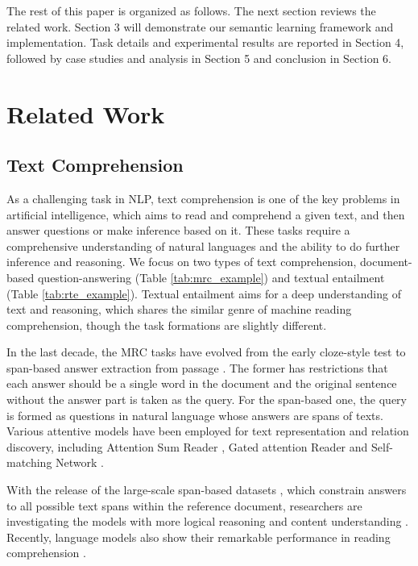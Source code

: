 \documentclass[11pt]{article}
\begin{document}
The rest of this paper is organized as follows. The next section reviews the related work. Section 3 will demonstrate our semantic learning framework and implementation. Task details and experimental results are reported in Section 4, followed by case studies and analysis in Section 5 and conclusion in Section 6.

\section{Related Work}

\subsection{Text Comprehension}
As a challenging task in NLP, text comprehension is one of the key problems in artificial intelligence, which aims to read and comprehend a given text, and then answer questions or make inference based on it. These tasks require a comprehensive understanding of natural languages and the ability to do further inference and reasoning. We focus on two types of text comprehension, document-based question-answering (Table \ref{tab:mrc_example}) and textual entailment (Table \ref{tab:rte_example}). Textual entailment aims for a deep understanding of text and reasoning, which shares the similar genre of machine reading comprehension, though the task formations are slightly different. 

In the last decade, the MRC tasks have evolved from the early cloze-style test \citep{hill2015goldilocks,hermann2015teaching,zhang2018char,zhang2018SubMRC} to span-based answer extraction from passage \citep{Rajpurkar2016SQuAD,Rajpurkar2018Know}. The former has restrictions that each answer should be a single word  in the document and the original sentence without the answer part is taken as the query. For the span-based one, the query is formed as questions in natural language whose answers are spans of texts. Various attentive models have been employed for text representation and relation discovery, including Attention Sum Reader \citep{kadlec2016text}, Gated attention Reader \citep{Dhingra2017Gated} and Self-matching Network \citep{Wang2017Gated}.

With the release of the large-scale span-based datasets \citep{Rajpurkar2016SQuAD,Joshi2017TriviaQA,Rajpurkar2018Know}, which constrain answers to all possible text spans within the reference document, researchers are investigating the models with more logical reasoning and content understanding \citep{wang2018multi}. Recently, language models also show their remarkable performance in reading comprehension \citep{devlin2018bert,Peters2018ELMO}.
\end{document}
